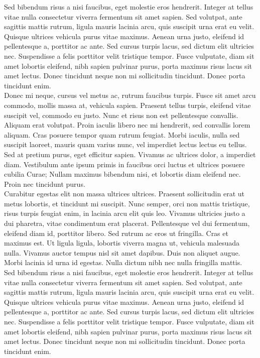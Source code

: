 Sed bibendum risus a nisi faucibus, eget molestie eros hendrerit. Integer at tellus vitae nulla consectetur viverra fermentum sit amet sapien. Sed volutpat, ante sagittis mattis rutrum, ligula mauris lacinia arcu, quis suscipit urna erat eu velit. Quisque ultrices vehicula purus vitae maximus. Aenean urna justo, eleifend id pellentesque a, porttitor ac ante. Sed cursus turpis lacus, sed dictum elit ultricies nec. Suspendisse a felis porttitor velit tristique tempor. Fusce vulputate, diam sit amet lobortis eleifend, nibh sapien pulvinar purus, porta maximus risus lacus sit amet lectus. Donec tincidunt neque non mi sollicitudin tincidunt. Donec porta tincidunt enim.
\\

Donec mi neque, cursus vel metus ac, rutrum faucibus turpis. Fusce sit amet arcu commodo, mollis massa at, vehicula sapien. Praesent tellus turpis, eleifend vitae suscipit vel, commodo eu justo. Nunc et risus non est pellentesque convallis. Aliquam erat volutpat. Proin iaculis libero nec mi hendrerit, sed convallis lorem aliquam. Cras posuere tempor quam rutrum feugiat. Morbi iaculis, nulla sed suscipit laoreet, mauris quam varius nunc, vel imperdiet lectus lectus eu tellus. Sed at pretium purus, eget efficitur sapien. Vivamus ac ultrices dolor, a imperdiet diam. Vestibulum ante ipsum primis in faucibus orci luctus et ultrices posuere cubilia Curae; Nullam maximus bibendum nisi, et lobortis diam eleifend nec. Proin nec tincidunt purus. 
\\

Curabitur egestas elit non massa ultrices ultrices. Praesent sollicitudin erat ut metus lobortis, et tincidunt mi suscipit. Nunc semper, orci non mattis tristique, risus turpis feugiat enim, in lacinia arcu elit quis leo. Vivamus ultricies justo a dui pharetra, vitae condimentum erat placerat. Pellentesque vel dui fermentum, eleifend diam id, porttitor libero. Sed rutrum ac eros ut fringilla. Cras et maximus est. Ut ligula ligula, lobortis viverra magna ut, vehicula malesuada nulla. Vivamus auctor tempus nisl sit amet dapibus. Duis non aliquet augue. Morbi lacinia id urna id egestas. Nulla dictum nibh nec nulla fringilla mattis.
\\

Sed bibendum risus a nisi faucibus, eget molestie eros hendrerit. Integer at tellus vitae nulla consectetur viverra fermentum sit amet sapien. Sed volutpat, ante sagittis mattis rutrum, ligula mauris lacinia arcu, quis suscipit urna erat eu velit. Quisque ultrices vehicula purus vitae maximus. Aenean urna justo, eleifend id pellentesque a, porttitor ac ante. Sed cursus turpis lacus, sed dictum elit ultricies nec. Suspendisse a felis porttitor velit tristique tempor. Fusce vulputate, diam sit amet lobortis eleifend, nibh sapien pulvinar purus, porta maximus risus lacus sit amet lectus. Donec tincidunt neque non mi sollicitudin tincidunt. Donec porta tincidunt enim.
\\
